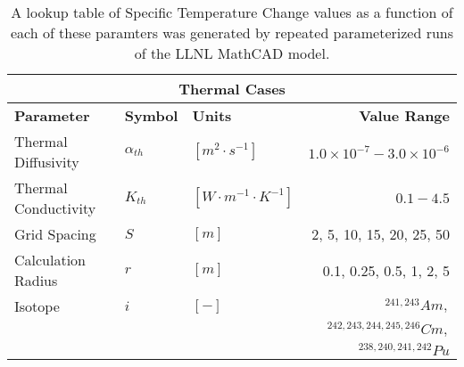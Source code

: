 \begin{table}[ht!]
\centering
\footnotesize{
\begin{tabular}{|l|l|l|r|}
\multicolumn{4}{c}{\textbf{Thermal Cases}}\\
\hline
\textbf{Parameter} & \textbf{Symbol} & \textbf{Units} & \textbf{Value Range} \\
\hline
Thermal Diffusivity & $\alpha_{th}$ & $[m^2\cdot s^{-1}]$ & $1.0\times10^{-7}-3.0\times10^{-6}$\\
\hline
Thermal Conductivity & $K_{th}$     & $[W\cdot m^{-1} \cdot K^{-1}]$ & $0.1 - 4.5$ \\
\hline
Grid Spacing & $S$ & $[m]$ & 2, 5, 10, 15, 20, 25, 50 \\
\hline
Calculation Radius & $r$ & $[m]$ & 0.1, 0.25, 0.5, 1, 2, 5 \\
\hline
Isotope & $i$ & $[-]$ & $^{241,243}Am,$  \\
        & & & $^{242,243,244,245,246}Cm,$  \\
        & & & $^{238,240,241,242}Pu$  \\
\hline
\end{tabular}
\caption{A lookup table of Specific Temperature Change values as a function of 
each of these paramters was generated by repeated parameterized runs of the LLNL 
MathCAD model\cite{greenberg_application_2012, sutton_investigations_2011}.}
\label{tab:therm_cases}
}
\end{table}

